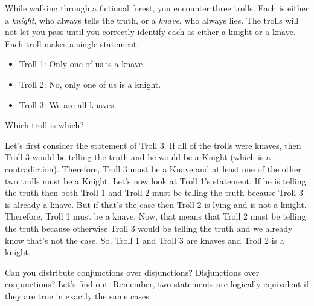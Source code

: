 \documentclass[10pt]{exam}
\def\and{\wedge}
\begin{document}
\begin{questions}
\question[4] While walking through a fictional forest, you encounter three trolls.  Each is either a {\em knight}, who always tells the truth, or a {\em knave}, who always lies.  The trolls will not let you pass until you correctly identify each as either a knight or a knave.  Each troll makes a single statement:
  \begin{itemize}
   \item[] Troll 1: Only one of us is a knave.
   \item[] Troll 2: No, only one of us is a knight.
   \item[] Troll 3: We are all knaves.
  \end{itemize}
  Which troll is which?
  \begin{solution}
  	Let's first consider the statement of Troll 3. If all of the trolls were knaves, then Troll 3 would be telling the truth and he would be a Knight (which is a contradiction). Therefore, Troll 3 must be a Knave and at least one of the other two trolls must be a Knight. Let's now look at Troll 1's statement. If he is telling the truth then both Troll 1 and Troll 2 must be telling the truth because Troll 3 is already a knave. But if that's the case then Troll 2 is lying and is not a knight. Therefore, Troll 1 must be a knave. Now, that means that Troll 2 must be telling the truth because otherwise Troll 3 would be telling the truth and we already know that's not the case. So, Troll 1 and Troll 3 are knaves and Troll 2 is a knight.
  \end{solution}
  \question[6] Can you distribute conjunctions over disjunctions?  Disjunctions over conjunctions?  Let's find out.  Remember, two statements are logically equivalent if they are true in exactly the same cases.
\end{questions}
\end{document}

